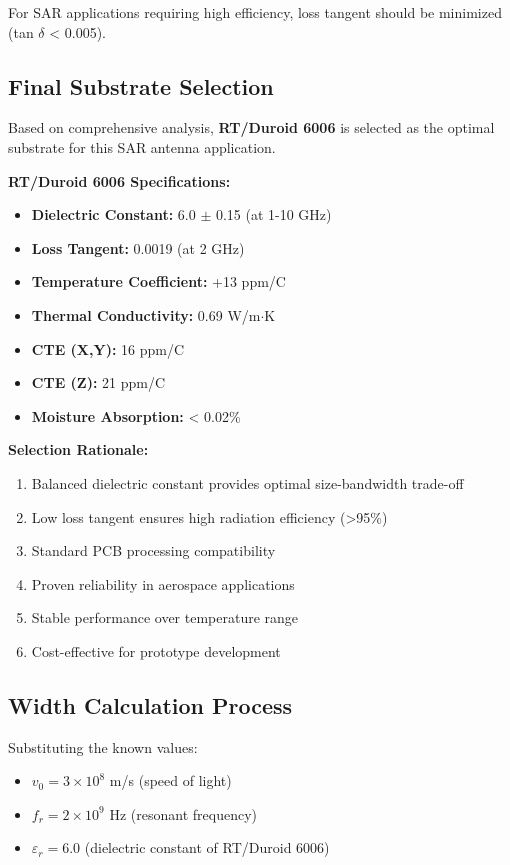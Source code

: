 \documentclass[12pt]{article}
\begin{document}
For SAR applications requiring high efficiency, loss tangent should be minimized (tan $\delta$ < 0.005).

\subsection{Final Substrate Selection}

Based on comprehensive analysis, \textbf{RT/Duroid 6006} is selected as the optimal substrate for this SAR antenna application.

\textbf{RT/Duroid 6006 Specifications:}
\begin{itemize}
    \item \textbf{Dielectric Constant:} 6.0 $\pm$ 0.15 (at 1-10 GHz)
    \item \textbf{Loss Tangent:} 0.0019 (at 2 GHz)
    \item \textbf{Temperature Coefficient:} +13 ppm/\textdegree C
    \item \textbf{Thermal Conductivity:} 0.69 W/m$\cdot$K
    \item \textbf{CTE (X,Y):} 16 ppm/\textdegree C
    \item \textbf{CTE (Z):} 21 ppm/\textdegree C
    \item \textbf{Moisture Absorption:} < 0.02\%
\end{itemize}

\textbf{Selection Rationale:}
\begin{enumerate}
    \item Balanced dielectric constant provides optimal size-bandwidth trade-off
    \item Low loss tangent ensures high radiation efficiency (>95\%)
    \item Standard PCB processing compatibility
    \item Proven reliability in aerospace applications
    \item Stable performance over temperature range
    \item Cost-effective for prototype development
\end{enumerate}

\subsection{Width Calculation Process}

Substituting the known values:
\begin{itemize}
    \item $v_0 = 3 \times 10^8$ m/s (speed of light)
    \item $f_r = 2 \times 10^9$ Hz (resonant frequency)
    \item $\varepsilon_r = 6.0$ (dielectric constant of RT/Duroid 6006)
\end{itemize}
\end{document}
